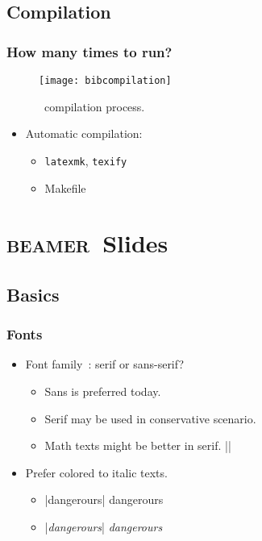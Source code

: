 \documentclass[CJKchecksingle]{beamer}
\newcommand{\BibTeX}{\hologo{BibTeX}}
\newcommand{\beamer}{\textsc{beamer}}
\begin{document}
\subsection{Compilation}

\begin{frame}[fragile]\frametitle{How many times to run?}

  \begin{figure}[htbp]
    \centering
    \texttt{[image: bibcompilation]}
    \caption{\BibTeX\ compilation process.}
  \end{figure}

\begin{itemize}
    \pause
\item Automatic compilation:
  \begin{itemize}
    \item \lstinline[style=cli]{latexmk}, \lstinline[style=cli]|texify|
    \item Makefile
  \end{itemize}
\end{itemize}

\end{frame}

\section{\beamer\ Slides}
\subsection{Basics}
\begin{frame}[fragile]\frametitle{Fonts}

\begin{itemize}
\item
  Font family~\cite{beamer}: serif or sans-serif?
\begin{itemize}
  \item
    Sans is preferred today.
  \item
    Serif may be used in conservative scenario.
  \item
    Math texts might be better in serif.
    ||
\end{itemize}
\pause
\item
  Prefer colored to italic texts.
\begin{itemize}
  \item |\alert{dangerours}| \alert{dangerours}
  \item |\emph{dangerours}| \emph{dangerours}
\end{itemize}
\end{itemize}

\end{frame}
\end{document}
